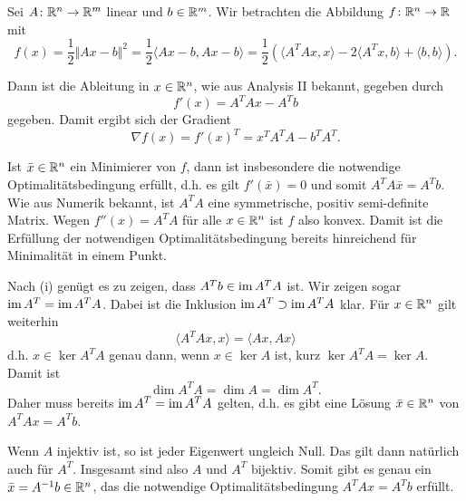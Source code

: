 Sei $A\colon \mathbb{R}^n\to\mathbb{R}^m$ linear und $b\in\mathbb{R}^m$. Wir betrachten die Abbildung $f\colon \mathbb{R}^n\to\mathbb{R}$ mit
\begin{displaymath}
 f(x)=\frac{1}{2}\Vert Ax-b\Vert^2=\frac{1}{2}\langle Ax-b,Ax-b\rangle=\frac{1}{2}(\langle A^TAx,x\rangle-2\langle A^Tx,b\rangle+\langle b,b\rangle).
\end{displaymath}
\begin{compactenum}[(i)]
 \item Dann ist die Ableitung in $x\in\mathbb{R}^n$, wie aus Analysis II bekannt, gegeben durch
 \begin{displaymath}
 f'(x)=  A^TAx- A^Tb
 \end{displaymath}
 gegeben. Damit ergibt sich der Gradient
 \begin{displaymath}
  \nabla f(x) = f'(x)^T= x^TA^TA-b^TA^T.
 \end{displaymath}
 \item Ist $\bar x\in\mathbb{R}^n$ ein Minimierer von $f$, dann ist insbesondere die notwendige Optimalitätsbedingung erfüllt, d.h. es gilt $f'(\bar x)=0$
 und somit $A^TA\bar x=A^Tb$. Wie aus Numerik bekannt, ist $A^TA$ eine symmetrische, positiv semi-definite Matrix. Wegen $f''(x)=A^TA$ für alle $x\in\mathbb{R}^n$ ist $f$ also konvex.
 Damit ist die Erfüllung der notwendigen Optimalitätsbedingung bereits hinreichend für Minimalität in einem Punkt.\\
 \item Nach (i) genügt es zu zeigen, dass $A^Tb\in\operatorname{im} A^TA$ ist. Wir zeigen sogar $\operatorname{im} A^T = \operatorname{im} A^TA$. Dabei ist die Inklusion $\operatorname{im} A^T \supset \operatorname{im} A^TA$ klar. Für $x\in\mathbb{R}^n$
 gilt weiterhin
 \begin{displaymath}
  \langle A^TAx,x\rangle=\langle Ax, Ax\rangle
 \end{displaymath}
 d.h. $x\in \ker A^TA$ genau dann, wenn $x\in \ker A$ ist, kurz $\ker A^TA=\ker A$. Damit ist 
 \begin{displaymath}
  \dim A^T A=\dim A=\dim A^T.
 \end{displaymath}
 Daher muss bereits $\operatorname{im} A^T = \operatorname{im} A^TA$ gelten, d.h. es gibt eine Lösung $\bar x\in\mathbb{R}^n$ von $A^TAx=A^Tb$.\\
 \item Wenn $A$ injektiv ist, so ist jeder Eigenwert ungleich Null. Das gilt dann natürlich auch für $A^T$. Insgesamt sind also $A$ und $A^T$ bijektiv.
 Somit gibt es genau ein $\bar x=A^{-1}b\in\mathbb{R}^n$, das die notwendige Optimalitätsbedingung $A^TAx=A^Tb$ erfüllt.
\end{compactenum}
